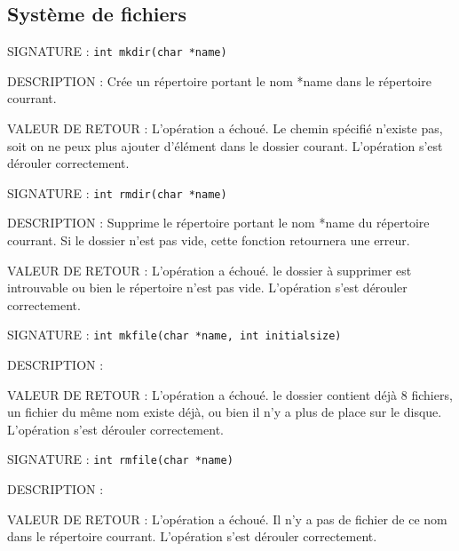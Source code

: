 \documentclass{article}
\begin{document}
	\subsection{Système de fichiers}
		\begin{description}
			\item{SIGNATURE : } \texttt{int mkdir(char *name)}
			\item{DESCRIPTION : } Crée un répertoire portant le nom *name dans le répertoire courrant.
			\item{VALEUR DE RETOUR : } 
				 L'opération a échoué. Le chemin spécifié n'existe pas, soit on ne peux plus ajouter d'élément dans le dossier courant.
				 L'opération s'est dérouler correctement.
		\end{description}
		\vspace{2.5mm}
		\begin{description}
			\item{SIGNATURE : } \texttt{int rmdir(char *name)}
			\item{DESCRIPTION : } Supprime le répertoire portant le nom *name du répertoire courrant. Si le dossier n'est pas vide, cette fonction retournera une erreur.
			\item{VALEUR DE RETOUR : } 
				 L'opération a échoué. le dossier à supprimer est introuvable ou bien le répertoire n'est pas vide.
				 L'opération s'est dérouler correctement.
		\end{description}
		\vspace{2.5mm}
		\begin{description}
			\item{SIGNATURE : } \texttt{int mkfile(char *name, int initialsize)}
			\item{DESCRIPTION : } 
			\item{VALEUR DE RETOUR : } 
				 L'opération a échoué. le dossier contient déjà 8 fichiers, un fichier du même nom existe déjà, ou bien il n'y a plus de place sur le disque.
				 L'opération s'est dérouler correctement.
		\end{description}
		\vspace{2.5mm}
		\begin{description}
			\item{SIGNATURE : } \texttt{int rmfile(char *name)}
			\item{DESCRIPTION : } 
			\item{VALEUR DE RETOUR : } 
				 L'opération a échoué. Il n'y a pas de fichier de ce nom dans le répertoire courrant.
				 L'opération s'est dérouler correctement.
		\end{description}
\end{document}
